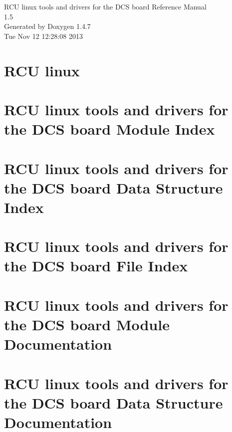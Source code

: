 \documentclass[a4paper]{book}
\begin{document}
\begin{titlepage}
\vspace*{7cm}
\begin{center}
{\Large RCU linux tools and drivers for the DCS board Reference Manual\\[1ex]\large 1.5 }\\
\vspace*{1cm}
{\large Generated by Doxygen 1.4.7}\\
\vspace*{0.5cm}
{\small Tue Nov 12 12:28:08 2013}\\
\end{center}
\end{titlepage}
\clearemptydoublepage
{}
\tableofcontents
\clearemptydoublepage
{}
\chapter{RCU linux }
\label{index}\hypertarget{index}{}
\chapter{RCU linux tools and drivers for the DCS board Module Index}

\chapter{RCU linux tools and drivers for the DCS board Data Structure Index}

\chapter{RCU linux tools and drivers for the DCS board File Index}

\chapter{RCU linux tools and drivers for the DCS board Module Documentation}







\chapter{RCU linux tools and drivers for the DCS board Data Structure Documentation}










\end{document}
